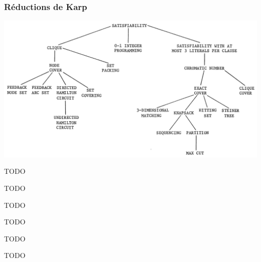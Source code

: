 \documentclass[aspectratio=169,11pt]{beamer}
\begin{document}
	\begin{frame}
		\frametitle{Réductions de Karp}
		\centering
		\includegraphics[width=\linewidth]{karp_reduction_tree}%
	\end{frame}


	\begin{frame}
		\centering TODO
	\end{frame}


	\begin{frame}
		\centering TODO
	\end{frame}


	\begin{frame}
		\centering TODO
	\end{frame}


	\begin{frame}
		\centering TODO
	\end{frame}


	\begin{frame}
		\centering TODO
	\end{frame}


	\begin{frame}
		\centering TODO
	\end{frame}
\end{document}
